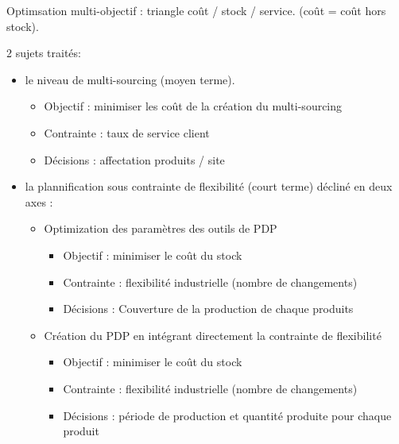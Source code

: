 Optimsation multi-objectif : triangle coût / stock / service. (coût = coût hors stock).


2 sujets traités:
\begin{itemize}
  \item le niveau de multi-sourcing (moyen terme).
  \begin{itemize}
    \item Objectif : minimiser les coût de la création du multi-sourcing
    \item Contrainte : taux de service client
    \item Décisions : affectation produits / site
  \end{itemize}
  \item la plannification sous contrainte de flexibilité (court terme) décliné en deux axes :
  \begin{itemize}
    \item Optimization des paramètres des outils de PDP
    \begin{itemize}
      \item Objectif : minimiser le coût du stock
      \item Contrainte : flexibilité industrielle (nombre de changements)
      \item Décisions : Couverture de la production de chaque produits
    \end{itemize}
    \item Création du PDP en intégrant directement la contrainte de flexibilité
    \begin{itemize}
      \item Objectif : minimiser le coût du stock
      \item Contrainte : flexibilité industrielle (nombre de changements)
      \item Décisions : période de production et quantité produite pour chaque produit
    \end{itemize}
  \end{itemize}
\end{itemize}
